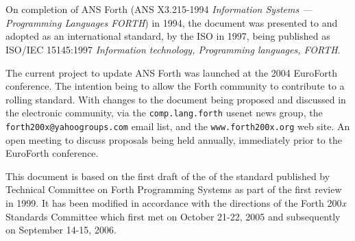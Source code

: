 \chapter*{}

\cbstart
{}

On completion of ANS Forth (ANS X3.215-1994 \emph{Information Systems
--- Programming Languages FORTH}) in 1994, the document was presented
to and adopted as an international standard, by the ISO in 1997, being
published as ISO/IEC 15145:1997 \emph{Information technology,
Programming languages, FORTH}.

The current project to update ANS Forth was launched at the 2004
EuroForth conference.  The intention being to allow the Forth community
to contribute to a rolling standard.  With changes to the document
being proposed and discussed in the electronic community, via the
\texttt{comp.lang.forth} usenet news group, the
\texttt{forth200x@yahoogroups.com} email list, and the
\texttt{www.forth200x.org} web site.  An open meeting to discuss
proposals being held annually, immediately prior to the EuroForth
conference.

This document is based on the first draft of the of the standard
published by Technical Committee on Forth Programming Systems as part
of the first review in 1999. It has been modified in accordance with
the directions of the Forth 200\emph{x} Standards Committee which first
met on October 21-22, 2005 and subsequently on
September 14-15, 2006.
\cbend
